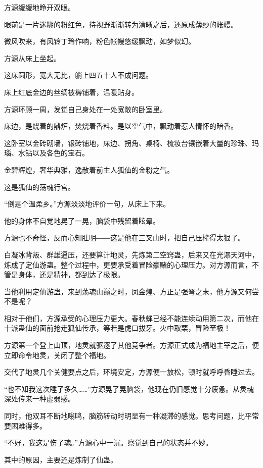 
\begin{this_body}

方源缓缓地睁开双眼。

眼前是一片迷糊的粉红色，待视野渐渐转为清晰之后，还原成薄纱的帐幔。

微风吹来，有风铃丁玲作响，粉色帐幔悠缓飘动，如梦似幻。

方源从床上坐起。

这床圆形，宽大无比，躺上四五十人不成问题。

床上红底金边的丝绸被褥铺着，温暖贴身。

方源环顾一周，发觉自己身处在一处宽敞的卧室里。

床边，是烧着的鼎炉，焚烧着香料。是以空气中，飘动着惹人情怀的暗香。

这卧室以金砖砌墙，银砖铺地，床边、拐角、桌椅、梳妆台镶嵌着大量的珍珠、玛瑙、水钻以及各色的宝石。

金碧辉煌，奢华典雅，逸散着前主人狐仙的金粉之气。

这是狐仙的荡魂行宫。

“倒是个温柔乡。”方源淡淡地评价一句，从床上下来。

他的身体不自觉地晃了一晃，脑袋中残留着眩晕。

方源也不奇怪，反而心知肚明――这是他在三叉山时，把自己压榨得太狠了。

白凝冰背叛、群雄逼压，还要算计地灵，先炼第二空窍蛊，后来又在光瀑天河中，炼成了定仙游蛊。整个过程中，更要承受着冒险豪赌的心理压力。对方源而言，不管是身体，还是精神，都到达了极限。

当他利用定仙游蛊，来到荡魂山巅之时，凤金煌、方正是强弩之末，他方源又何尝不是呢？

相对于他们，方源承受的心理压力更大。春秋蝉已经不能连续动用第二次，而他在十派蛊仙的面前抢走狐仙传承，等若是虎口拔牙。火中取栗，冒险至极！

方源第一个登上山顶，地灵就驱逐了其他竞争者。方源正式成为福地主宰之后，便立即命令地灵，关闭了整个福地。

交代了地灵几个关健要点之后，环境安定，方源便一放松，顿时就呼呼昏睡过去。

“也不知我这次睡了多久……”方源晃了晃脑袋，他现在仍旧感觉十分疲惫。从灵魂深处传来一种虚弱感。

同时，他双耳不断地嗡鸣，脑筋转动时明显有一种凝滞的感觉。思考问题，比平常要困难得多。

“不好，我这是伤了魂。”方源心中一沉。察觉到自己的状态并不妙。

其中的原因，主要还是炼制了仙蛊。


\end{this_body}

